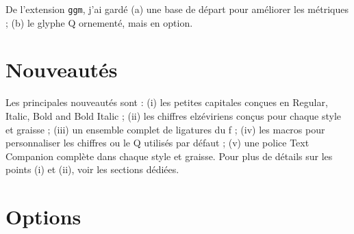 \documentclass[12pt,english,french]{article}
\begin{document}
De l'extension \texttt{ggm}, j'ai gardé (a) une base de départ pour améliorer les métriques ; (b) le glyphe Q ornementé, mais en option.

\section{Nouveautés}


Les principales nouveautés  sont : (i) les petites capitales conçues en Regular, Italic, Bold and Bold Italic ; (ii) les chiffres elzéviriens conçus pour chaque style et graisse ; (iii) un ensemble complet de ligatures du f ; (iv) les macros pour personnaliser les chiffres ou le Q utilisés par défaut ; (v) une police Text Companion complète dans chaque style et graisse. Pour plus de détails sur les points (i) et (ii), voir les sections dédiées.

\section{Options}
\end{document}
